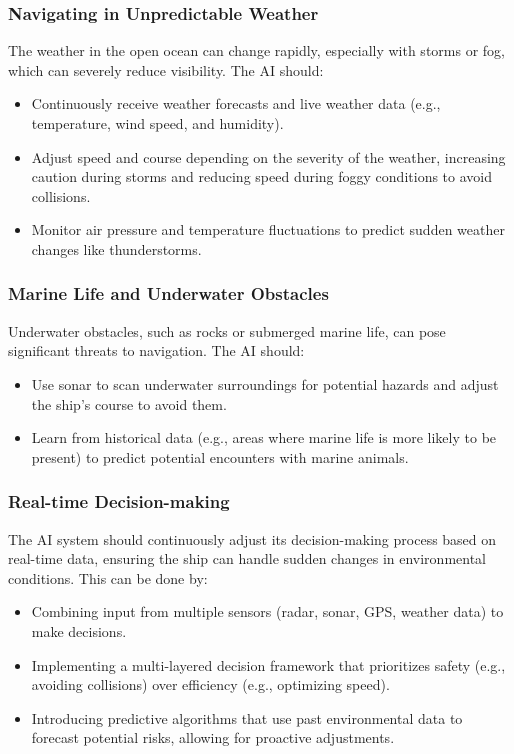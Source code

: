 \documentclass{article}
\begin{document}
\subsubsection{\large Navigating in Unpredictable Weather}
The weather in the open ocean can change rapidly, especially with storms or fog, which can severely reduce visibility. The AI should:
\begin{itemize}
    \item Continuously receive weather forecasts and live weather data (e.g., temperature, wind speed, and humidity).
    \item Adjust speed and course depending on the severity of the weather, increasing caution during storms and reducing speed during foggy conditions to avoid collisions.
    \item Monitor air pressure and temperature fluctuations to predict sudden weather changes like thunderstorms.
\end{itemize}

\subsubsection{\large Marine Life and Underwater Obstacles}
Underwater obstacles, such as rocks or submerged marine life, can pose significant threats to navigation. The AI should:
\begin{itemize}
    \item Use sonar to scan underwater surroundings for potential hazards and adjust the ship’s course to avoid them.
    \item Learn from historical data (e.g., areas where marine life is more likely to be present) to predict potential encounters with marine animals.
\end{itemize}

\subsubsection{\large Real-time Decision-making}
The AI system should continuously adjust its decision-making process based on real-time data, ensuring the ship can handle sudden changes in environmental conditions. This can be done by:
\begin{itemize}
    \item Combining input from multiple sensors (radar, sonar, GPS, weather data) to make decisions.
    \item Implementing a multi-layered decision framework that prioritizes safety (e.g., avoiding collisions) over efficiency (e.g., optimizing speed).
    \item Introducing predictive algorithms that use past environmental data to forecast potential risks, allowing for proactive adjustments.
\end{itemize}
\end{document}
